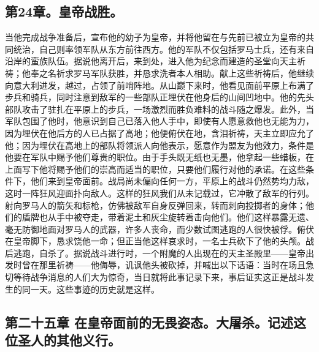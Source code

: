 
\subsection{第24章。皇帝战胜。}

当他完成战争准备后，宣布他的幼子为皇帝，并将他留在与先前已被立为皇帝的共同统治，自己则率领军队从东方前往西方。他的军队不仅包括罗马士兵，还有来自沿岸的蛮族队伍。据说他离开后，来到处，进入他为纪念而建造的圣堂向天主祈祷；他奉之名祈求罗马军队获胜，并恳求洗者本人相助。献上这些祈祷后，他继续向意大利进发，越过，占领了前哨阵地。从山巅下来时，他看见面前平原上布满了步兵和骑兵，同时注意到敌军的一些部队正埋伏在他身后的山间凹地中。他的先头部队攻击了驻扎在平原上的步兵，一场激烈而胜负难料的战斗随之爆发。此外，当军队包围了他时，他意识到自己已落入他人手中，即使有人愿意救他也无能为力，因为埋伏在他后方的人已占据了高地；他便俯伏在地，含泪祈祷，天主立即应允了他；因为埋伏在高地上的部队将领派人向他表示，愿意作为盟友为他效力，条件是他要在军队中赐予他们尊贵的职位。由于手头既无纸也无墨，他拿起一些蜡板，在上面写下他将赐予他们的崇高而适当的职位，只要他们履行对他的承诺。在这些条件下，他们来到皇帝面前。战局尚未偏向任何一方，平原上的战斗仍然势均力敌，这时一阵狂风迎面扑向敌人。这样的狂风我们从未记载过，它冲散了敌军的行列。射向罗马人的箭矢和标枪，仿佛被敌军自身反弹回来，转而刺向投掷者的身体；他们的盾牌也从手中被夺走，带着泥土和灰尘旋转着击向他们。他们这样暴露无遗、毫无防御地面对罗马人的武器，许多人丧命，而少数试图逃跑的人很快被俘。俯伏在皇帝脚下，恳求饶他一命；但正当他这样哀求时，一名士兵砍下了他的头颅。战后逃跑，自杀了。据说战斗进行时，一个附魔的人出现在的天主圣殿里——皇帝出发时曾在那里祈祷——他侮辱，讥讽他头被砍掉，并喊出以下话语：当时在场且急切等待战争消息的人们大为惊奇，当日就将此事记录下来，事后证实这正是战斗发生的同一天。这些事迹的历史就是这样。\par


\subsection{第二十五章 在皇帝面前的无畏姿态。大屠杀。记述这位圣人的其他义行。}

